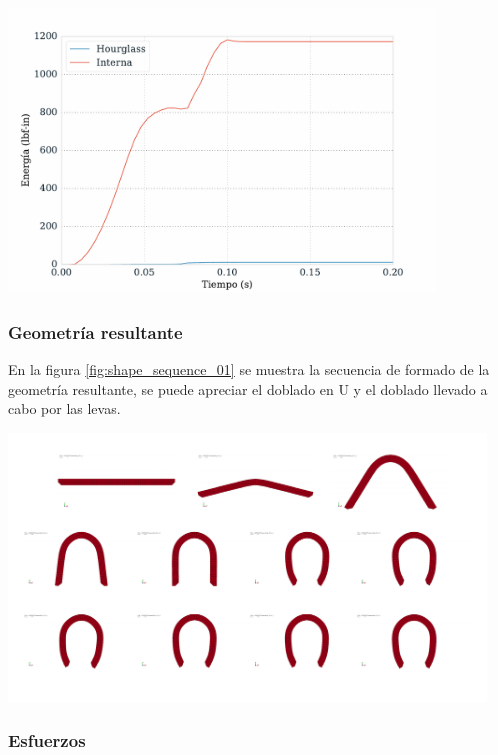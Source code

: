 \begin{center}
\includegraphics[width=0.85\textwidth]{src/ch4/hourglass_internal_01.pdf}
\label{fig:hourglass_internal_01}
\end{center}


\subsubsection{Geometría resultante}

En la figura \ref{fig:shape_sequence_01} se muestra la secuencia de formado 
de la geometría resultante, se puede apreciar el doblado en U y el doblado 
llevado a cabo por las levas.

\begin{center}
\includegraphics[width=0.95\textwidth]{src/ch4/shape_sequence_01.pdf}
\label{fig:shape_sequence_01}
\end{center}

\subsubsection{Esfuerzos}

